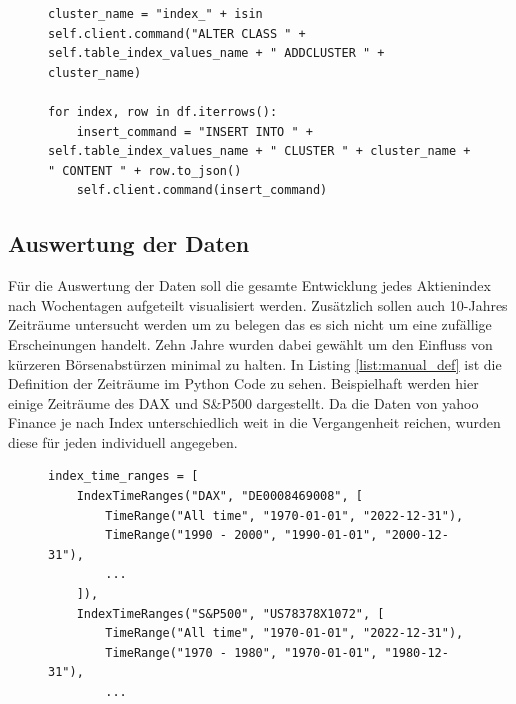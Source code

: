 \begin{figure}[!htb]
    \begin{lstlisting}[caption=Erstellung eines Clusters und Einfügen der Datensätze, label=list:cluster_and_load]
cluster_name = "index_" + isin
self.client.command("ALTER CLASS " + self.table_index_values_name + " ADDCLUSTER " + cluster_name)

for index, row in df.iterrows():
    insert_command = "INSERT INTO " + self.table_index_values_name + " CLUSTER " + cluster_name + " CONTENT " + row.to_json()
    self.client.command(insert_command)
    \end{lstlisting}
\end{figure}


\subsection{Auswertung der Daten}

Für die Auswertung der Daten soll die gesamte Entwicklung jedes Aktienindex nach Wochentagen aufgeteilt visualisiert werden. Zusätzlich sollen auch 10-Jahres Zeiträume untersucht werden um zu belegen das es sich nicht um eine zufällige Erscheinungen handelt. Zehn Jahre wurden dabei gewählt um den Einfluss von kürzeren Börsenabstürzen minimal zu halten. In Listing \ref{list:manual_def} ist die Definition der Zeiträume im Python Code zu sehen. Beispielhaft werden hier einige Zeiträume des DAX und S\&P500 dargestellt. Da die Daten von yahoo Finance je nach Index unterschiedlich weit in die Vergangenheit reichen, wurden diese für jeden individuell angegeben.

\begin{figure}[!htb]
    \begin{lstlisting}[caption=Manuelle Definition der Untersuchungszeiträume, label=list:manual_def]
index_time_ranges = [
    IndexTimeRanges("DAX", "DE0008469008", [
        TimeRange("All time", "1970-01-01", "2022-12-31"), 
        TimeRange("1990 - 2000", "1990-01-01", "2000-12-31"), 
        ...
    ]),
    IndexTimeRanges("S&P500", "US78378X1072", [
        TimeRange("All time", "1970-01-01", "2022-12-31"), 
        TimeRange("1970 - 1980", "1970-01-01", "1980-12-31"), 
        ...
    \end{lstlisting}
\end{figure}

